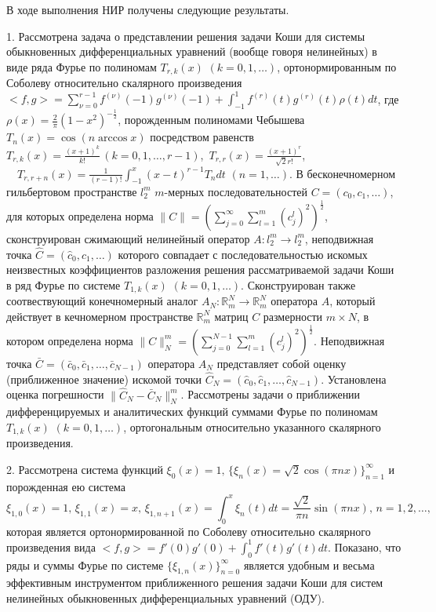 \Conclusion

В ходе выполнения НИР получены следующие результаты.

1. Рассмотрена задача о представлении решения задачи Коши для системы  обыкновенных  дифференциальных  уравнений (вообще говоря нелинейных) в виде  ряда  Фурье по полиномам $T_{r,k}(x)$ $(k=0,1,\ldots)$, ортонормированным по Соболеву относительно скалярного произведения
$<f,g>=\sum_{\nu=0}^{r-1}f^{(\nu)}(-1)g^{(\nu)}(-1)+\int_{-1}^1 f^{(r)}(t)g^{(r)}(t)\rho(t)dt$, где $\rho(x)=\frac2\pi(1-x^2)^{-\frac12}$, порожденным полиномами Чебышева $T_n(x)=\cos(n\arccos x)$ посредством равенств $T_{r,k}(x) =\frac{(x+1)^k}{k!}\, ( k=0,1,\ldots, r-1)$,\, $T_{r,r}(x) =\frac{(x+1)^r}{\sqrt{2}r!}$,\, $\quad T_{r,r+n}(x) =\frac{1}{(r-1)!}\int_{-1}^x(x-t)^{r-1}T_{n}dt\,\, ( n=1,\ldots)$.  В бесконечномерном гильбертовом  пространстве $l_2^m$ $m$-мерных последовательностей  $C=(c_0,c_1,\ldots)$, для которых определена норма
$\|C\|=\left(\sum\nolimits_{j=0}^\infty \sum\nolimits_{l=1}^{m}(c_j^l)^2\right)^\frac12$, сконструирован сжимающий нелинейный оператор  $A: l_2^m\to l_2^m$,  неподвижная точка $\hat C=(\hat c_0,\hat c_1,\ldots)$ которого совпадает с последовательностью  искомых неизвестных коэффициентов разложения решения рассматриваемой задачи Коши в ряд Фурье по системе $T_{1,k}(x)$ $(k=0,1,\ldots)$. Сконструирован также соотвествующий конечномерный аналог $A_N:\mathbb{R}^N_m\to \mathbb{R}^N_m$ оператора $A$, который действует в кечномерном пространстве  $\mathbb{R}^N_m$ матриц $C$ размерности $m\times N$, в котором определена норма
$\|C\|_N^m=\left(\sum\nolimits_{j=0}^{N-1} \sum\nolimits_{l=1}^{m}(c_j^l)^2\right)^\frac12$. Неподвижная точка $\bar C=(\bar c_0,\bar c_1,\ldots, \bar c_{N-1})$ оператора $A_N$ представляет собой оценку (приближенное значение) искомой точки $\hat C_N=(\hat c_0,\hat c_1,\ldots, \hat c_{N-1})$. Установлена оценка погрешности $\|\hat C_N-\bar C_N\|_N^m$. Рассмотрены задачи о приближении дифференцируемых и аналитических функций суммами Фурье по полиномам $T_{1,k}(x)$ $(k=0,1,\ldots)$, ортогональным относительно указанного скалярного произведения.


2. Рассмотрена система функций  $\xi_0(x)=1,\, \{\xi_n(x)=\sqrt{2}\cos(\pi nx)\}_{n=1}^\infty$ и порожденная ею система
$$
\xi_{1,0}(x)=1,\, \xi_{1,1}(x)=x,\, \xi_{1,n+1}(x)=\int_0^x \xi_{n}(t)dt=\frac{\sqrt{2}}{\pi n}\sin(\pi nx),\, n=1,2,\ldots,
$$
которая является ортонормированной по Соболеву относительно скалярного произведения  вида $<f,g>=f'(0)g'(0)+\int_{0}^{1}f'(t)g'(t)dt$. Показано, что ряды и суммы Фурье по системе $\{\xi_{1,n}(x)\}_{n=0}^\infty$  является удобным и весьма эффективным инструментом приближенного решения задачи Коши для систем нелинейных обыкновенных дифференциальных уравнений (ОДУ).

